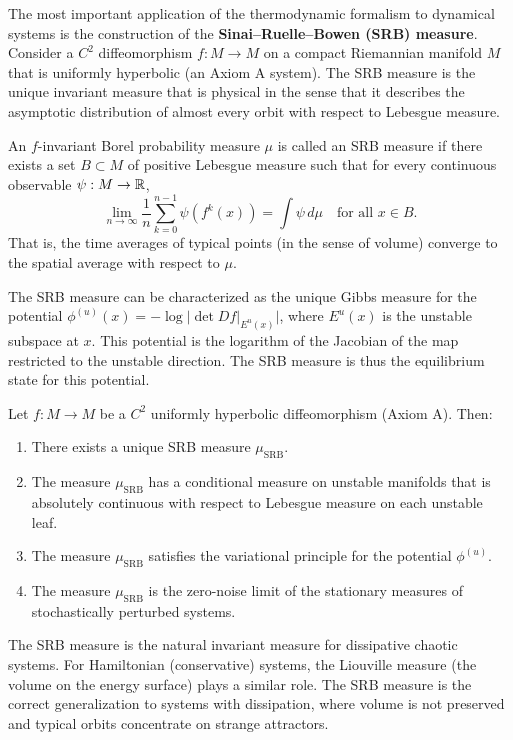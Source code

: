 The most important application of the thermodynamic formalism to dynamical systems is the construction of the \textbf{Sinai--Ruelle--Bowen (SRB) measure}. Consider a \(C^2\) diffeomorphism \(f: M \to M\) on a compact Riemannian manifold \(M\) that is uniformly hyperbolic (an Axiom A system). The SRB measure is the unique invariant measure that is physical in the sense that it describes the asymptotic distribution of almost every orbit with respect to Lebesgue measure.

\begin{definition}
An \(f\)-invariant Borel probability measure \(\mu\) is called an SRB measure if there exists a set \(B \subset M\) of positive Lebesgue measure such that for every continuous observable \(\psi: M \to \mathbb{R}\),
\[
\lim_{n \to \infty} \frac{1}{n} \sum_{k=0}^{n-1} \psi(f^k(x)) = \int \psi\, d\mu \quad \text{for all } x \in B.
\]
That is, the time averages of typical points (in the sense of volume) converge to the spatial average with respect to \(\mu\).
\end{definition}

The SRB measure can be characterized as the unique Gibbs measure for the potential \(\phi^{(u)}(x) = -\log |\det Df|_{E^u(x)}|\), where \(E^u(x)\) is the unstable subspace at \(x\). This potential is the logarithm of the Jacobian of the map restricted to the unstable direction. The SRB measure is thus the equilibrium state for this potential.

\begin{theorem}
Let \(f: M \to M\) be a \(C^2\) uniformly hyperbolic diffeomorphism (Axiom A). Then:
\begin{enumerate}
  \item There exists a unique SRB measure \(\mu_{\text{SRB}}\).
  \item The measure \(\mu_{\text{SRB}}\) has a conditional measure on unstable manifolds that is absolutely continuous with respect to Lebesgue measure on each unstable leaf.
  \item The measure \(\mu_{\text{SRB}}\) satisfies the variational principle for the potential \(\phi^{(u)}\).
  \item The measure \(\mu_{\text{SRB}}\) is the zero-noise limit of the stationary measures of stochastically perturbed systems.
\end{enumerate}
\end{theorem}

The SRB measure is the natural invariant measure for dissipative chaotic systems. For Hamiltonian (conservative) systems, the Liouville measure (the volume on the energy surface) plays a similar role. The SRB measure is the correct generalization to systems with dissipation, where volume is not preserved and typical orbits concentrate on strange attractors.

